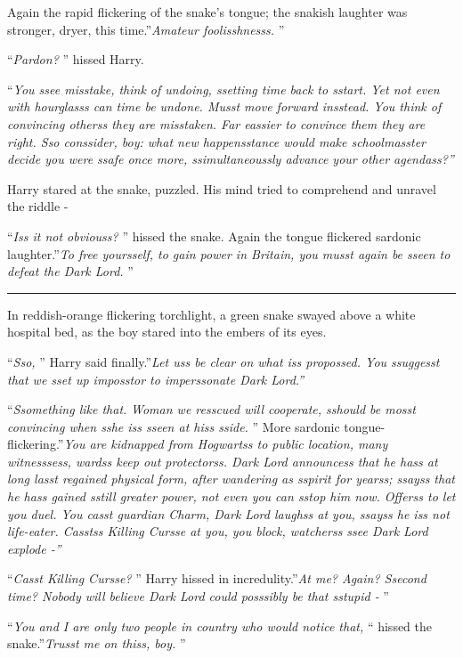 Again the rapid flickering of the snake's tongue; the snakish laughter
was stronger, dryer, this time.''\emph{Amateur foolisshnesss.} ''

``\emph{Pardon?} '' hissed Harry.

``\emph{You ssee misstake, think of undoing, ssetting time back to
sstart. Yet not even with hourglasss can time be undone. Musst move
forward insstead. You think of convincing otherss they are misstaken.
Far eassier to convince them they are right. Sso conssider, boy: what
new happensstance would make schoolmasster decide you were ssafe once
more, ssimultaneoussly advance your other agendass?''}

Harry stared at the snake, puzzled. His mind tried to comprehend and
unravel the riddle -

``\emph{Iss it not obviouss?} '' hissed the snake. Again the tongue
flickered sardonic laughter.''\emph{To free yoursself, to gain power in
Britain, you musst again be sseen to defeat the Dark Lord.} ''

\begin{center}\rule{3in}{0.4pt}\end{center}

In reddish-orange flickering torchlight, a green snake swayed above a
white hospital bed, as the boy stared into the embers of its eyes.

``\emph{Sso,} '' Harry said finally.''\emph{Let uss be clear on what iss
propossed. You ssuggesst that we sset up imposstor to imperssonate Dark
Lord.''}

``\emph{Ssomething like that.} \emph{Woman we resscued will cooperate,
sshould be mosst convincing when sshe iss sseen at hiss sside.} '' More
sardonic tongue-flickering.''\emph{You are kidnapped from Hogwartss to
public location, many witnesssess, wardss keep out protectorss. Dark
Lord announcess that he hass at long lasst regained physical form, after
wandering as sspirit for yearss; ssayss that he hass gained sstill
greater power, not even you can sstop him now. Offerss to let you duel.
You casst guardian Charm, Dark Lord laughss at you, ssayss he iss not
life-eater. Casstss Killing Cursse at you, you block, watcherss ssee
Dark Lord explode -''}

``\emph{Casst Killing Cursse?} '' Harry hissed in incredulity.''\emph{At
me? Again? Ssecond time? Nobody will believe Dark Lord could posssibly
be that sstupid -} ''

``\emph{You and I are only two people in country who would notice that,}
`` hissed the snake.''\emph{Trusst me on thiss, boy.} ''

